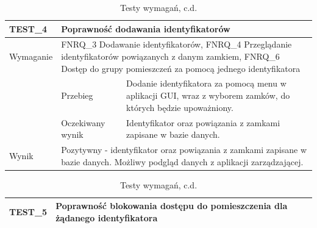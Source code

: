         \pagebreak

        \begin{table}[h!]
            \ContinuedFloat
            \caption{Testy wymagań, c.d.}
            \begin{subtable}[c]{\textwidth}
                \centering
                    \begin{tabular}{|p{2cm}|p{}|p{}|}
                    \hline
                    TEST\_4               & \multicolumn{2}{l|}{\textbf{Poprawność dodawania identyfikatorów}}                                                            \\ \hline
                    \cellcolor[gray]{0.8} Wymaganie             & \multicolumn{2}{p{12cm}|}{FNRQ\_3 Dodawanie identyfikatorów, FNRQ\_4 Przeglądanie identyfikatorów powiązanych z danym zamkiem, FNRQ\_6 Dostęp do grupy pomieszczeń za pomocą jednego identyfikatora }                                                                                    \\ \hline
                    \cellcolor[gray]{0.8} \multirow{2}{*}{Opis} & Przebieg           & Dodanie identyfikatora za pomocą menu w aplikacji GUI, wraz z wyborem zamków, do których będzie upoważniony.  \\ \cline{2-3}
                    \cellcolor[gray]{0.8}                      & Oczekiwany wynik   & Identyfikator oraz powiązania z zamkami zapisane w bazie danych.                                                 \\ \hline
                    \cellcolor[gray]{0.8} Wynik                 & \multicolumn{2}{p{12cm}|}{Pozytywny - identyfikator oraz powiązania z zamkami zapisane w bazie danych. Możliwy podgląd danych z aplikacji zarządzającej.}                                                                                  \\ \hline
                    \end{tabular}%
                \label{tbl:test4}
                \vspace{10mm}
            \end{subtable}
        \quad%
            \begin{subtable}[c]{\textwidth}
                \centering
                    \begin{tabular}{|p{2cm}|p{}|p{}|}
                    \hline
                    TEST\_5               & \multicolumn{2}{p{12cm}|}{\textbf{Poprawność blokowania dostępu do pomieszczenia dla żądanego identyfikatora}}                                                            \\ \hline

\end{tabular}
\end{subtable}
\end{table}

